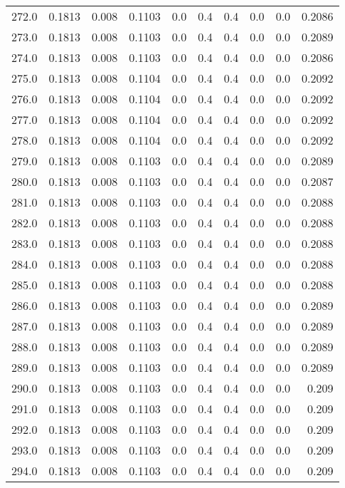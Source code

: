 \begin{longtable}{lrrrrrrrrr}
272.0 & 0.1813 & 0.008 & 0.1103 & 0.0 & 0.4 & 0.4 & 0.0 & 0.0 & 0.2086 \\
273.0 & 0.1813 & 0.008 & 0.1103 & 0.0 & 0.4 & 0.4 & 0.0 & 0.0 & 0.2089 \\
274.0 & 0.1813 & 0.008 & 0.1103 & 0.0 & 0.4 & 0.4 & 0.0 & 0.0 & 0.2086 \\
275.0 & 0.1813 & 0.008 & 0.1104 & 0.0 & 0.4 & 0.4 & 0.0 & 0.0 & 0.2092 \\
276.0 & 0.1813 & 0.008 & 0.1104 & 0.0 & 0.4 & 0.4 & 0.0 & 0.0 & 0.2092 \\
277.0 & 0.1813 & 0.008 & 0.1104 & 0.0 & 0.4 & 0.4 & 0.0 & 0.0 & 0.2092 \\
278.0 & 0.1813 & 0.008 & 0.1104 & 0.0 & 0.4 & 0.4 & 0.0 & 0.0 & 0.2092 \\
279.0 & 0.1813 & 0.008 & 0.1103 & 0.0 & 0.4 & 0.4 & 0.0 & 0.0 & 0.2089 \\
280.0 & 0.1813 & 0.008 & 0.1103 & 0.0 & 0.4 & 0.4 & 0.0 & 0.0 & 0.2087 \\
281.0 & 0.1813 & 0.008 & 0.1103 & 0.0 & 0.4 & 0.4 & 0.0 & 0.0 & 0.2088 \\
282.0 & 0.1813 & 0.008 & 0.1103 & 0.0 & 0.4 & 0.4 & 0.0 & 0.0 & 0.2088 \\
283.0 & 0.1813 & 0.008 & 0.1103 & 0.0 & 0.4 & 0.4 & 0.0 & 0.0 & 0.2088 \\
284.0 & 0.1813 & 0.008 & 0.1103 & 0.0 & 0.4 & 0.4 & 0.0 & 0.0 & 0.2088 \\
285.0 & 0.1813 & 0.008 & 0.1103 & 0.0 & 0.4 & 0.4 & 0.0 & 0.0 & 0.2088 \\
286.0 & 0.1813 & 0.008 & 0.1103 & 0.0 & 0.4 & 0.4 & 0.0 & 0.0 & 0.2089 \\
287.0 & 0.1813 & 0.008 & 0.1103 & 0.0 & 0.4 & 0.4 & 0.0 & 0.0 & 0.2089 \\
288.0 & 0.1813 & 0.008 & 0.1103 & 0.0 & 0.4 & 0.4 & 0.0 & 0.0 & 0.2089 \\
289.0 & 0.1813 & 0.008 & 0.1103 & 0.0 & 0.4 & 0.4 & 0.0 & 0.0 & 0.2089 \\
290.0 & 0.1813 & 0.008 & 0.1103 & 0.0 & 0.4 & 0.4 & 0.0 & 0.0 & 0.209 \\
291.0 & 0.1813 & 0.008 & 0.1103 & 0.0 & 0.4 & 0.4 & 0.0 & 0.0 & 0.209 \\
292.0 & 0.1813 & 0.008 & 0.1103 & 0.0 & 0.4 & 0.4 & 0.0 & 0.0 & 0.209 \\
293.0 & 0.1813 & 0.008 & 0.1103 & 0.0 & 0.4 & 0.4 & 0.0 & 0.0 & 0.209 \\
294.0 & 0.1813 & 0.008 & 0.1103 & 0.0 & 0.4 & 0.4 & 0.0 & 0.0 & 0.209 \\

\end{longtable}
